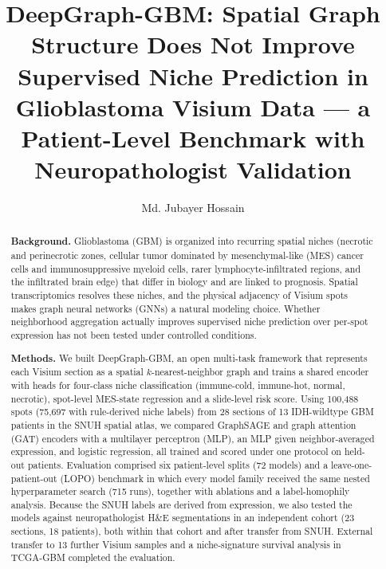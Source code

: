 \documentclass[11pt,letterpaper]{article}
\title{\vspace{-1.5em}\bfseries DeepGraph-GBM: Spatial Graph Structure Does Not Improve Supervised Niche Prediction in Glioblastoma Visium Data --- a Patient-Level Benchmark with Neuropathologist Validation}
\author[1,2,*]{Md. Jubayer Hossain}
\affil[1]{Center for Health Innovation, Research, Action, and Learning - Bangladesh}
\affil[2]{DeepBio}
\affil[*]{Corresponding author: \texttt{hossainmj.me@gmail.com}}
\date{}
\begin{document}
\maketitle
\thispagestyle{fancy}

\begin{abstract}
\small
\noindent\textbf{Background.} Glioblastoma (GBM) is organized into recurring spatial niches (necrotic and perinecrotic zones, cellular tumor dominated by mesenchymal-like (MES) cancer cells and immunosuppressive myeloid cells, rarer lymphocyte-infiltrated regions, and the infiltrated brain edge) that differ in biology and are linked to prognosis. Spatial transcriptomics resolves these niches, and the physical adjacency of Visium spots makes graph neural networks (GNNs) a natural modeling choice. Whether neighborhood aggregation actually improves supervised niche prediction over per-spot expression has not been tested under controlled conditions.

\noindent\textbf{Methods.} We built DeepGraph-GBM, an open multi-task framework that represents each Visium section as a spatial $k$-nearest-neighbor graph and trains a shared encoder with heads for four-class niche classification (immune-cold, immune-hot, normal, necrotic), spot-level MES-state regression and a slide-level risk score. Using 100{,}488 spots (75{,}697 with rule-derived niche labels) from 28 sections of 13 IDH-wildtype GBM patients in the SNUH spatial atlas, we compared GraphSAGE and graph attention (GAT) encoders with a multilayer perceptron (MLP), an MLP given neighbor-averaged expression, and logistic regression, all trained and scored under one protocol on held-out patients. Evaluation comprised six patient-level splits (72 models) and a leave-one-patient-out (LOPO) benchmark in which every model family received the same nested hyperparameter search (715 runs), together with ablations and a label-homophily analysis. Because the SNUH labels are derived from expression, we also tested the models against neuropathologist H\&E segmentations in an independent cohort (23 sections, 18 patients), both within that cohort and after transfer from SNUH. External transfer to 13 further Visium samples and a niche-signature survival analysis in TCGA-GBM completed the evaluation.


\end{abstract}
\end{document}
